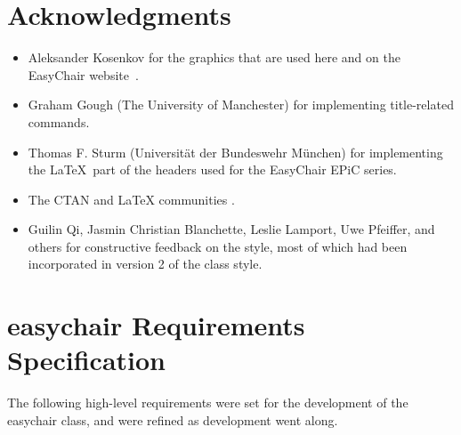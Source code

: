 \documentclass[EPiC]{easychair}
\newcommand{\easychair}{\textsf{easychair}}
\begin{document}
\section{Acknowledgments}
\label{sect:acks}

\begin{itemize}
\item
Aleksander Kosenkov for the graphics that are used here and on the EasyChair 
website~\cite{easychair}.

\item
Graham Gough (The University of Manchester) for implementing title-related
commands.

\item
Thomas F. Sturm (Universit\"at der Bundeswehr M\"unchen) for implementing the
\LaTeX\ part of the headers used for the EasyChair EPiC series.

\item
The CTAN \cite{ctan} and {\LaTeX} communities \cite{texniccenter,miktex}.

\item
Guilin Qi, Jasmin Christian Blanchette, Leslie Lamport, Uwe Pfeiffer,
and others for constructive feedback on the style, most of which had been
incorporated in version 2 of the class style.
\end{itemize}

\label{sect:bib}

%
%
%


\appendix
\section{{\easychair} Requirements Specification}
\label{sect:easychair-requirements}

The following high-level requirements were set for the development of 
the {\easychair} class, and were refined as development went along.
\end{document}
